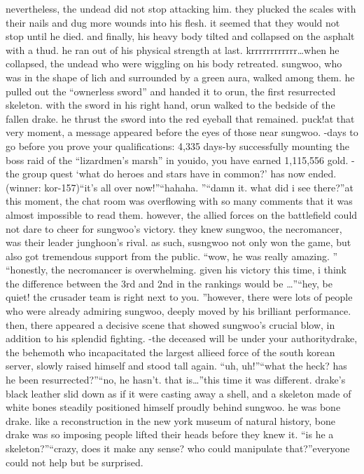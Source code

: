  nevertheless, the undead did not stop attacking him.
 they plucked the scales with their nails and dug more wounds into his flesh.
 it seemed that they would not stop until he died.
and finally, his heavy body tilted and collapsed on the asphalt with a thud.
he ran out of his physical strength at last.
krrrrrrrrrrrr…when he collapsed, the undead who were wiggling on his body retreated.
sungwoo, who was in the shape of lich and surrounded by a green aura, walked among them.
he pulled out the “ownerless sword” and handed it to orun, the first resurrected skeleton.
with the sword in his right hand, orun walked to the bedside of the fallen drake.
he thrust the sword into the red eyeball that remained.
puck!at that very moment, a message appeared before the eyes of those near sungwoo.
-days to go before you prove your qualifications: 4,335 days-by successfully mounting the boss raid of the “lizardmen’s marsh” in youido, you have earned 1,115,556 gold.
-the group quest ‘what do heroes and stars have in common?’ has now ended.
 (winner: kor-157)“it’s all over now!”“hahaha.
”“damn it.
 what did i see there?”at this moment, the chat room was overflowing with so many comments that it was almost impossible to read them.
however, the allied forces on the battlefield could not dare to cheer for sungwoo’s victory.
they knew sungwoo, the necromancer, was their leader junghoon’s rival.
 as such, susngwoo not only won the game, but also got tremendous support from the public.
“wow, he was really amazing.
”
“honestly, the necromancer is overwhelming.
 given his victory this time, i think the difference between the 3rd and 2nd in the rankings would be …”“hey, be quiet! the crusader team is right next to you.
”however, there were lots of people who were already admiring sungwoo, deeply moved by his brilliant performance.
then, there appeared a decisive scene that showed sungwoo’s crucial blow, in addition to his splendid fighting.
-the deceased will be under your authoritydrake, the behemoth who incapacitated the largest allieed force of the south korean server, slowly raised himself and stood tall again.
“uh, uh!”“what the heck? has he been resurrected?”“no, he hasn’t.
 that is…”this time it was different.
 drake’s black leather slid down as if it were casting away a shell, and a skeleton made of white bones steadily positioned himself proudly behind sungwoo.
he was bone drake.
like a reconstruction in the new york museum of natural history, bone drake was so imposing people lifted their heads before they knew it.
“is he a skeleton?”“crazy, does it make any sense? who could manipulate that?”everyone could not help but be surprised.
